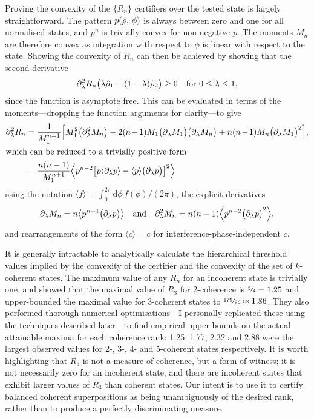 Proving the convexity of the $\{R_n\}$ certifiers over the tested state is largely straightforward.
The pattern $p(\hat{\rho},\,\phi)$ is always between zero and one for all normalised states, and $p^n$ is trivially convex for non-negative $p$.
The moments $M_n$ are therefore convex as integration with respect to $\phi$ is linear with respect to the state.
Showing the convexity of $R_n$ can then be achieved by showing that the second derivative
\begin{equation}
\partial_\lambda^2 R_n\bigl(\lambda \hat{\rho}_1 + (1-\lambda)\hat{\rho}_2\bigr) \ge 0 \quad\text{for $0\le\lambda\le1$},
\end{equation}
since the function is asymptote free.
This can be evaluated in terms of the moments---dropping the function arguments for clarity---to give
\begin{align}
\partial_\lambda^2R_n &= \frac1{M_1^{n+1}}\Bigl[M_1^2\bigl(\partial_\lambda^2M_n\bigr) - 2\msquash{(n-1)}M_1\bigl(\partial_\lambda M_1\bigr)\bigl(\partial_\lambda M_n\bigr) + n\msquash{(n-1)}M_n{\bigl(\partial_\lambda M_1\bigr)}^2\Bigr],\\
\intertext{which can be reduced to a trivially positive form}
&= \frac{n(n-1)}{M_1^{n+1}}\Bigl\langle p^{n-2}{\bigl[p\langle\partial_\lambda p\rangle - \langle p\rangle\bigl(\partial_\lambda p\bigr)\bigr]}^2\Bigr\rangle
\end{align}
using the notation $\langle f\rangle = \int_0^{2\pi}\mathrm d\phi\,f(\phi)/(2\pi)$, the explicit derivatives
\begin{equation}
\partial_\lambda M_n = n\bigl\langle p^{n-1}\bigl(\partial_\lambda p\bigr)\bigr\rangle
\quad\text{and}\quad
\partial_\lambda^2 M_n = n(n-1)\Bigl\langle p^{n-2}\bigl(\partial_\lambda p\bigr)^2\Bigr\rangle,
\end{equation}
and rearrangements of the form $\langle c\rangle = c$ for interference-phase-independent $c$.

It is generally intractable to analytically calculate the hierarchical threshold values implied by the convexity of the certifier and the convexity of the set of $k$-coherent states.
The maximum value of any $R_n$ for an incoherent state is trivially one, and \citet{Dive2020} showed that the maximal value of $R_3$ for 2-coherence is $\text{\sfrac{5}{\kern-.03em 4}} = 1.25$ and upper-bounded the maximal value for 3-coherent states to $\text{\sfrac{179}{96}} \approx1.86$.
They also performed thorough numerical optimisations---I personally replicated these using the techniques described later---to find empirical upper bounds on the actual attainable maxima for each coherence rank: 1.25, 1.77, 2.32 and 2.88 were the largest observed values for 2-, 3-, 4- and 5-coherent states respectively.
It is worth highlighting that $R_3$ is not a measure of coherence, but a form of witness; it is not necessarily zero for an incoherent state, and there are incoherent states that exhibit larger values of $R_3$ than coherent states.
Our intent is to use it to certify balanced coherent superpositions as being unambiguously of the desired rank, rather than to produce a perfectly discriminating measure.

